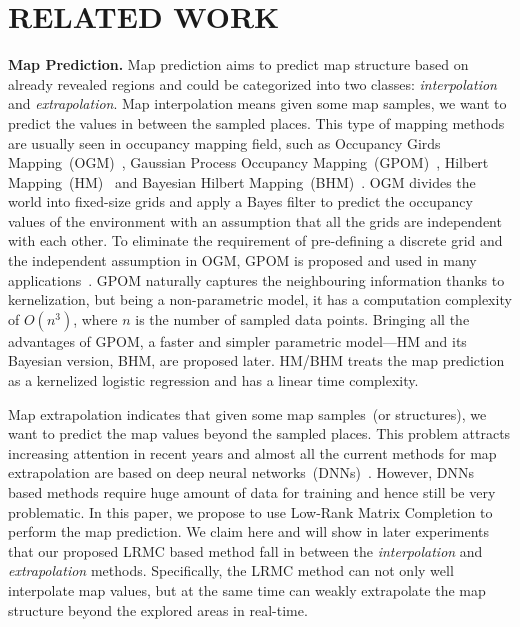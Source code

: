 \section{RELATED WORK}

\textbf{Map Prediction.} Map prediction aims to predict map structure based on already revealed regions and could be categorized into two classes: \textit{interpolation} and \textit{extrapolation}. Map interpolation means given some map samples, we want to predict the values in between the sampled places. This type of mapping methods are usually seen in occupancy mapping field, such as Occupancy Girds Mapping~(OGM)~\cite{elfes1989using}, Gaussian Process Occupancy Mapping~(GPOM)~\cite{o2012gaussian, wang2016fast}, Hilbert Mapping~(HM)~\cite{ramos2016hilbert} and Bayesian Hilbert Mapping~(BHM)~\cite{senanayake2017bayesian}. OGM divides the world into fixed-size grids and apply a Bayes filter to predict the occupancy values of the environment with an assumption that all the grids are independent with each other. To eliminate the requirement of pre-defining a discrete grid and the independent assumption in OGM, GPOM is proposed and used in many applications~\cite{jadidi2014exploration, jadidi2015mutual}. GPOM naturally captures the neighbouring information thanks to kernelization, but being a non-parametric model, it has a computation complexity of $O(n^3)$, where $n$ is the number of sampled data points. Bringing all the advantages of GPOM, a faster and simpler parametric model---HM and its Bayesian version, BHM, are proposed later. HM/BHM treats the map prediction as a kernelized logistic regression and has a linear time complexity. 

Map extrapolation indicates that given some map samples~(or structures), we want to predict the map values beyond the sampled places. This problem attracts increasing attention in recent years and almost all the current methods for map extrapolation are based on deep neural networks~(DNNs)~\cite{caley2019deep, pronobis2017learning, katyal2018occupancy, shrestha2019learned, saroya2020online, katyal2019uncertainty}. However, DNNs based methods require huge amount of data for training and hence still be very problematic. In this paper, we propose to use Low-Rank Matrix Completion to perform the map prediction. We claim here and will show in later experiments that our proposed LRMC based method fall in between the \textit{interpolation} and \textit{extrapolation} methods. Specifically, the LRMC method can not only well interpolate map values, but at the same time can weakly extrapolate the map structure beyond the explored areas in real-time. 

